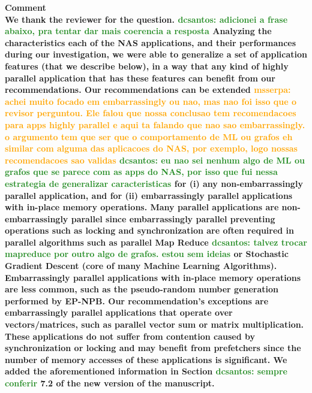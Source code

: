 \documentclass{article}
\newcounter{answer}
\newenvironment{answer}
{ \refstepcounter{answer}\vspace{0.5cm}\bfseries\noindent Comment~\theanswer\\ }
{ \vspace{0.5cm} }
\newcommand{\ms}[1]{\textcolor{orange}{\textbf{ msserpa: #1} }\vspace{0.2cm}}
\newcommand{\dcs}[1]{\textcolor{ForestGreen}{\textbf{dcsantos: #1} }\vspace{0.2cm}}
\begin{document}
\begin{answer}

We thank the reviewer for the question. \dcs{adicionei a frase abaixo, pra tentar dar mais coerencia a resposta}
Analyzing the characteristics each of the NAS applications, and their performances during our investigation, we were able to generalize a set of application features (that we describe below), in a way that any kind of highly parallel application that has these features can benefit from our recommendations.  Our recommendations can be extended \ms{achei muito focado em embarrassingly ou nao, mas nao foi isso que o revisor perguntou. Ele falou que nossa conclusao tem recomendacoes para apps highly parallel e aqui ta falando que nao sao embarrassingly. o argumento tem que ser que o comportamento de ML ou grafos eh similar com alguma das aplicacoes do NAS, por exemplo, logo nossas recomendacoes sao validas} \dcs{eu nao sei nenhum algo de ML ou grafos que se parece com as apps do NAS, por isso que fui nessa estrategia de generalizar caracteristicas} for (i) any non-embarrassingly parallel application, and for (ii) embarrassingly parallel applications with in-place memory operations. Many parallel applications are non-embarrassingly parallel since embarrassingly parallel preventing operations such as locking and synchronization are often required in parallel algorithms such as parallel Map Reduce \dcs{talvez trocar mapreduce por outro algo de grafos. estou sem ideias} or Stochastic Gradient Descent (core of many Machine Learning Algorithms). Embarrassingly parallel applications with in-place memory operations are less common, such as the pseudo-random number generation performed by EP-NPB. Our recommendation's exceptions are embarrassingly parallel applications that operate over vectors/matrices, such as parallel vector sum or matrix multiplication. These applications do not suffer from contention caused by synchronization or locking and may benefit from prefetchers since the number of memory accesses of these applications is significant. We added the aforementioned information in Section \dcs{sempre conferir}7.2 of the new version of the manuscript.
\end{answer}
\end{document}
